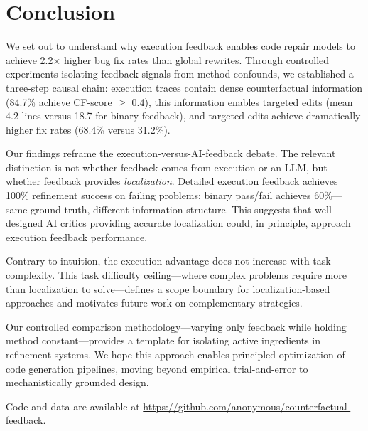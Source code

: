 \section{Conclusion}
\label{sec:conclusion}

We set out to understand why execution feedback enables code repair models to achieve 2.2$\times$ higher bug fix rates than global rewrites. Through controlled experiments isolating feedback signals from method confounds, we established a three-step causal chain: execution traces contain dense counterfactual information (84.7\% achieve CF-score $\geq$ 0.4), this information enables targeted edits (mean 4.2 lines versus 18.7 for binary feedback), and targeted edits achieve dramatically higher fix rates (68.4\% versus 31.2\%).

Our findings reframe the execution-versus-AI-feedback debate. The relevant distinction is not whether feedback comes from execution or an LLM, but whether feedback provides \emph{localization}. Detailed execution feedback achieves 100\% refinement success on failing problems; binary pass/fail achieves 60\%---same ground truth, different information structure. This suggests that well-designed AI critics providing accurate localization could, in principle, approach execution feedback performance.

Contrary to intuition, the execution advantage does not increase with task complexity. This task difficulty ceiling---where complex problems require more than localization to solve---defines a scope boundary for localization-based approaches and motivates future work on complementary strategies.

Our controlled comparison methodology---varying only feedback while holding method constant---provides a template for isolating active ingredients in refinement systems. We hope this approach enables principled optimization of code generation pipelines, moving beyond empirical trial-and-error to mechanistically grounded design.

Code and data are available at \url{https://github.com/anonymous/counterfactual-feedback}.
